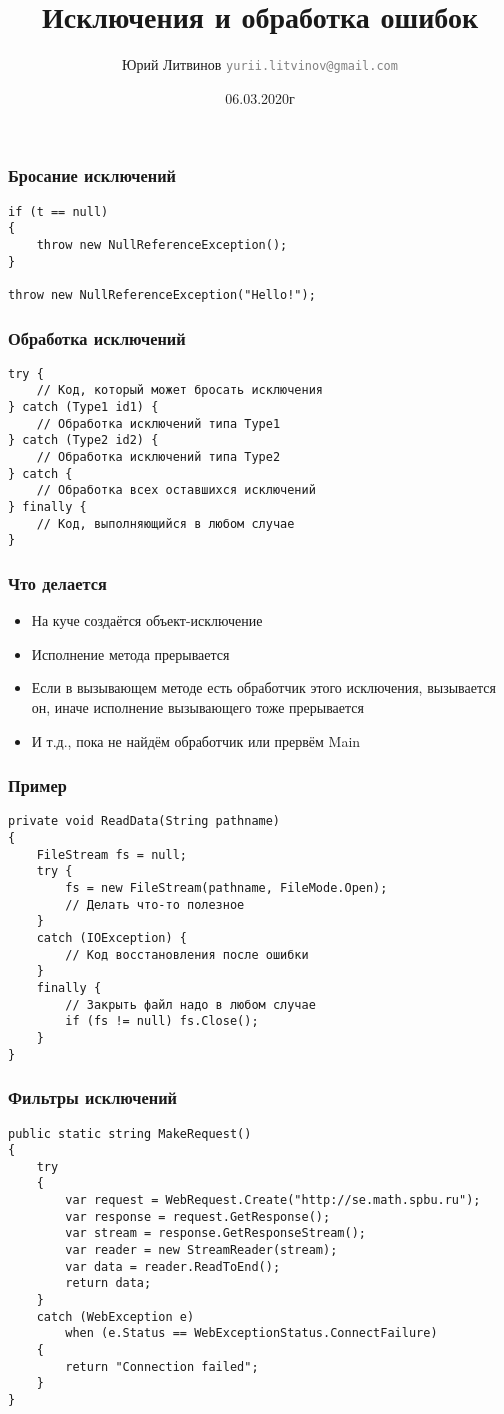 \documentclass[xetex,mathserif,serif]{beamer}
\title{Исключения и обработка ошибок}
\author[Юрий Литвинов]{Юрий Литвинов \newline \textcolor{gray}{\small\texttt{yurii.litvinov@gmail.com}}}
\date{06.03.2020г}
\begin{document}
	
	\frame{\titlepage}

	\begin{frame}[fragile]
		\frametitle{Бросание исключений}
		\begin{verbatim}
if (t == null)
{
    throw new NullReferenceException();
}

throw new NullReferenceException("Hello!");
		\end{verbatim}
	\end{frame}

	\begin{frame}[fragile]
		\frametitle{Обработка исключений}
		\begin{verbatim}
try {
    // Код, который может бросать исключения
} catch (Type1 id1) {
    // Обработка исключений типа Type1
} catch (Type2 id2) {
    // Обработка исключений типа Type2
} catch {
    // Обработка всех оставшихся исключений
} finally {
    // Код, выполняющийся в любом случае
}
		\end{verbatim}
	\end{frame}

	\begin{frame}
		\frametitle{Что делается}
		\begin{itemize}
			\item На куче создаётся объект-исключение
			\item Исполнение метода прерывается
			\item Если в вызывающем методе есть обработчик этого исключения, вызывается он, иначе исполнение вызывающего тоже прерывается
			\item И т.д., пока не найдём обработчик или прервём Main
		\end{itemize}
	\end{frame}

	\begin{frame}[fragile]
		\frametitle{Пример}
		\begin{verbatim}
private void ReadData(String pathname) 
{
    FileStream fs = null;
    try {
        fs = new FileStream(pathname, FileMode.Open);
        // Делать что-то полезное
    }
    catch (IOException) {
        // Код восстановления после ошибки
    }
    finally {
        // Закрыть файл надо в любом случае
        if (fs != null) fs.Close();
    }
}
		\end{verbatim}
	\end{frame}

	\begin{frame}[fragile]
		\frametitle{Фильтры исключений}
		\begin{small}
			\begin{verbatim}
public static string MakeRequest()
{
    try
    {
        var request = WebRequest.Create("http://se.math.spbu.ru");
        var response = request.GetResponse();
        var stream = response.GetResponseStream();
        var reader = new StreamReader(stream);
        var data = reader.ReadToEnd();
        return data;
    }
    catch (WebException e) 
        when (e.Status == WebExceptionStatus.ConnectFailure)
    {
        return "Connection failed";
    }
}
			\end{verbatim}
		\end{small}
	\end{frame}
\end{document}
